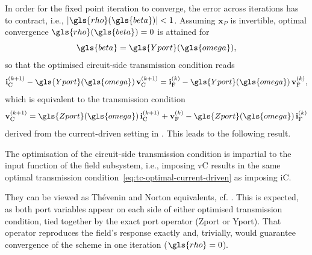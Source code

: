 In order for the fixed point iteration to converge, the error across iterations has to contract, i.e., $\lvert\gls{rho}(\gls{beta})\rvert < 1$. Assuming $\mathbf{x}_P$ is invertible, optimal convergence $\gls{rho}(\gls{beta}) = 0$ is attained for
\begin{equation*}
    \gls{beta} = \gls{Yport}(\gls{omega}),
\end{equation*}
so that the optimised circuit-side transmission condition reads
\begin{equation}\label{eq:tc-optimal-voltage-driven}
    \mathbf{i}_{\text{C}}^{(k+1)} - \gls{Yport}(\gls{omega})\, \mathbf{v}_{\text{C}}^{(k+1)}
      = \mathbf{i}_{\text{F}}^{(k)} - \gls{Yport}(\gls{omega})\, \mathbf{v}_{\text{F}}^{(k)},
\end{equation}
which is equivalent to the transmission condition
\begin{equation}\label{eq:tc-optimal-current-driven}
    \mathbf{v}_{\text{C}}^{(k+1)} = \gls{Zport}(\gls{omega})\, \mathbf{i}_{\text{C}}^{(k+1)} + \mathbf{v}_{\text{F}}^{(k)} - \gls{Zport}(\gls{omega})\, \mathbf{i}_{\text{F}}^{(k)}
\end{equation}
derived from the current-driven setting in \cite{Garcia2017}. This leads to the following result.
\begin{corollary}
    The optimisation of the circuit-side transmission condition is impartial to the input function of the field subsystem, i.e., imposing \gls{vC} results in the same optimal transmission condition~\eqref{eq:tc-optimal-current-driven} as imposing \gls{iC}.
\end{corollary}
They can be viewed as Thévenin and Norton equivalents, cf. \cite{Nshimiyimana2016}.
This is expected, as both port variables appear on each side of either optimised transmission condition, tied together by the exact port operator (\gls{Zport} or \gls{Yport}). That operator reproduces the field's response exactly and, trivially, would guarantee convergence of the scheme in one iteration ($\gls{rho} = 0$).

